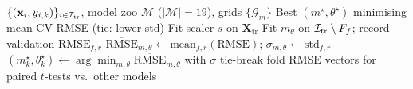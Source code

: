\begin{algorithm}[t]
  \caption{Repeated CV hyperparameter search for one target $k$ (train pool only)}
  \label{alg:cv-target}
  \begin{algorithmic}[1]
    \Require $\{(\mathbf{x}_i, y_{i,k})\}_{i \in \mathcal{I}_{\mathrm{tr}}}$, model zoo $\mathcal{M}$ ($|\mathcal{M}|{=}19$), grids $\{\mathcal{G}_m\}$
    \Ensure Best $(m^\star, \theta^\star)$ minimising mean CV RMSE (tie: lower std)
    \State Fit scaler $s$ on $\mathbf{X}_{\mathrm{tr}}$ 
          \State Fit $m_\theta$ on $\mathcal{I}_{\mathrm{tr}} \setminus F_f$; record validation $\mathrm{RMSE}_{f,r}$
        \EndFor
        \State $\overline{\mathrm{RMSE}}_{m,\theta} \leftarrow \mathrm{mean}_{f,r}(\mathrm{RMSE})$; $\sigma_{m,\theta} \leftarrow \mathrm{std}_{f,r}$
      \EndFor
      \State $(m^\star_k, \theta^\star_k) \leftarrow \arg\min_{m,\theta} \overline{\mathrm{RMSE}}_{m,\theta}$ with $\sigma$ tie-break
    \EndFor
    \State \Return fold RMSE vectors for paired $t$-tests vs.\ other models
  \end{algorithmic}
\end{algorithm}
